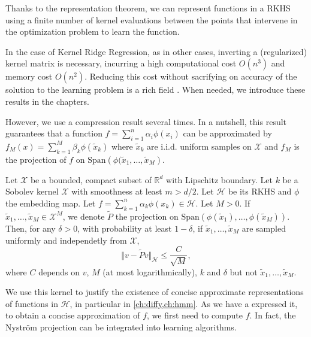 Thanks to the representation theorem, we can represent functions in a RKHS using a finite number of kernel evaluations between the points that intervene in the optimization problem to learn the function.

In the case of Kernel Ridge Regression, as in other cases, inverting a (regularized) kernel matrix is necessary, incurring a high computational cost $O(n^3)$ and memory cost $O(n^2)$. Reducing this cost without sacrifying on accuracy of the solution to the learning problem is a rich field \citep{refs}. When needed, we introduce these results in the chapters.

However, we use a compression result several times. In a nutshell, this result guarantees that a function $f=\sum_{i=1}^n\alpha_i\phi(x_i)$ can be approximated by $f_M(x) = \sum_{k=1}^M \beta_k \phi(\tilde x_k)$ where $\tilde x_k$ are i.i.d. uniform samples on $\mathcal X $ and $f_M$ is the projection of $f$ on $\mathrm{Span}\left(\phi(\tilde x_1, \ldots, \tilde x_M\right)$.

\begin{mdframed}
\begin{proposition}
Let $\mathcal X$ be a bounded, compact subset of $\mathbb R^d$ with Lipschitz boundary.
Let $k$ be a Sobolev kernel $\mathcal X$ with smoothness at least $m > d / 2$. Let $\mathcal H$ be its RKHS and $\phi$ the embedding map. Let $f = \sum_{k=1}^n\alpha_k \phi(x_k) \in\mathcal H$. Let $M > 0$. If $\tilde x_1, \ldots, \tilde x_M \in \mathcal X^M$, we denote $\tilde P$ the projection on $\mathrm{Span}\left(\phi(\tilde x_1), \ldots, \phi(\tilde x_M)\right)$. Then, for any $\delta > 0$, with probability at least $1-\delta$, if $\tilde x_1, \ldots, \tilde x_M$ are sampled uniformly and independetly from $\mathcal X$,
\begin{equation}
    \Vert v - \tilde Pv \Vert_\mathcal H \leq \frac{C}{\sqrt{M}},
\end{equation}
where $C$ depends on $v$, $M$ (at most logarithmically), $k$ and $\delta$ but not $\tilde x_1, \ldots, \tilde x_M$.
\end{proposition}
\end{mdframed}

We use this kernel to justify the existence of concise approximate representations of functions in $\mathcal H$, in particular in \cref{ch:diffy,ch:hmm}. As we have a expressed it, to obtain a concise approximation of $f$, we first need to compute $f$. In fact, the Nyström projection can be integrated into learning algorithms.

